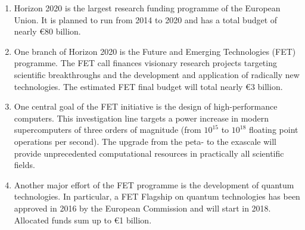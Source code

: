 \begin{enumerate}
 \item Horizon 2020 is the largest research funding programme of the European Union. It is planned to run from 2014 to 2020 and has a total budget of nearly \euro 80 billion. 
 \item One branch of Horizon 2020 is the Future and Emerging Technologies (FET) programme. The FET call finances visionary research projects targeting scientific breakthroughs and the development and application of radically new technologies. The estimated FET final budget will total nearly \euro 3 billion. 
 \item One central goal of the FET initiative is the design of high-performance computers. This investigation line targets a power increase in modern supercomputers of three orders of magnitude (from $10^{15}$ to $10^{18}$ floating point operations per second). The upgrade from the peta- to the exascale will provide unprecedented computational resources in practically all scientific fields.
 \item Another major effort of the FET programme is the development of quantum technologies. In particular, a FET Flagship on quantum technologies has been approved in 2016 by the European Commission and will start in 2018. Allocated funds sum up to \euro 1 billion.    
\end{enumerate}
